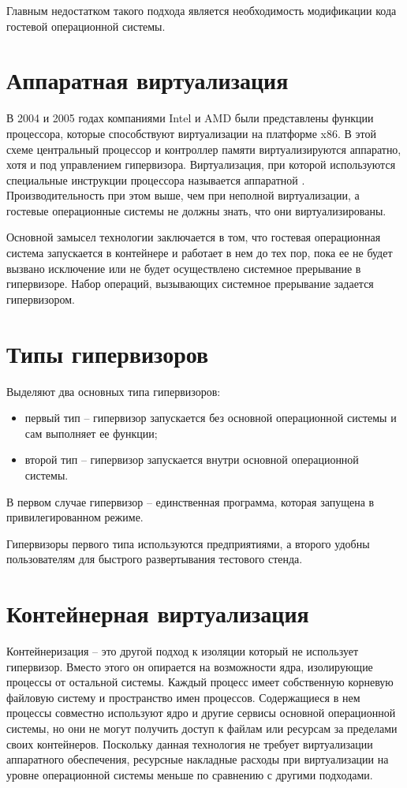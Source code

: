 Главным недостатком такого подхода является необходимость модификации кода гостевой операционной системы.

\section{Аппаратная виртуализация}

В 2004 и 2005 годах компаниями Intel и AMD были представлены функции процессора, которые способствуют виртуализации на платформе x86. 
В этой схеме центральный процессор и контроллер памяти виртуализируются аппаратно, хотя и под управлением гипервизора.
Виртуализация, при которой используются специальные инструкции процессора называется аппаратной \cite{гоношенко2020аппаратно}.
Производительность при этом выше, чем при неполной виртуализации, а гостевые операционные системы не должны знать, что они виртуализированы.

Основной замысел технологии заключается в том, что гостевая операционная система запускается в контейнере и работает в нем до тех пор, пока ее не будет вызвано исключение или не будет осуществлено системное прерывание в гипервизоре.
Набор операций, вызывающих системное прерывание задается гипервизором.

\section{Типы гипервизоров}
Выделяют два основных типа гипервизоров:
\begin{itemize}
	\item первый тип -- гипервизор запускается без основной операционной системы и сам выполняет ее функции;
	\item второй тип -- гипервизор запускается внутри основной операционной системы.
\end{itemize}

В первом случае гипервизор -- единственная программа, которая запущена в привилегированном режиме.

Гипервизоры первого типа используются предприятиями, а второго удобны пользователям для быстрого развертывания тестового стенда.

\section{Контейнерная виртуализация}

Контейнеризация -- это другой подход к изоляции который не использует гипервизор.
Вместо этого он опирается на возможности ядра, изолирующие процессы от остальной системы.
Каждый процесс имеет собственную корневую файловую систему и пространство имен процессов. 
Содержащиеся в нем процессы совместно используют ядро и другие сервисы основной операционной системы, но они не могут получить доступ к файлам или ресурсам за пределами своих контейнеров.
Поскольку данная технология не требует виртуализации аппаратного обеспечения, ресурсные накладные расходы при виртуализации на уровне операционной системы меньше по сравнению с другими подходами.

